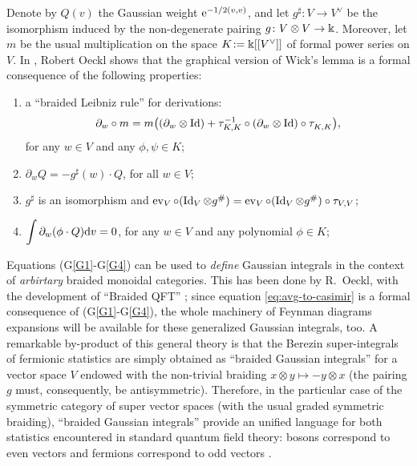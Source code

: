 \begin{remark}
  Denote by $Q(v)$ the Gaussian weight $\mathrm{e}^{-1/2(v,v)}$, and let
  $g^\sharp\colon V\to V^\lor$ be the isomorphism induced by the
  non-degenerate pairing $g\colon V\otimes V\to\Bbbk$. Moreover, let
  $m$ be the usual multiplication on the space $K \joinrel:=
  \fk[[V^\lor]]$ of formal power series on $V$.  In
  \cite{oeckl;braided-qft}, Robert Oeckl shows that the graphical
  version of Wick's lemma is a formal consequence of the following
  properties:
\begin{enumerate}[(G1)]
\item\label{G1} a ``braided Leibniz rule'' for derivations:
\[\partial_w\circ m=m\bigl((\partial_w\otimes
\operatorname{Id})+\tau^{-1}_{K, K}\circ(\partial_w\otimes\operatorname{Id}) \circ \tau^{}_{K,
  K}\bigr),\] for any $w\in V$ and any $\phi, \psi\in K$;
\item\label{G2} $\partial_w Q = -g^\sharp(w)\cdot Q$, for all $w\in V$;
\item\label{G3} $g^\sharp$ is an isomorphism and
$\operatorname{ev}_V\circ(\operatorname{Id}_V\otimes g^\#)=\operatorname{ev}_V\circ(\operatorname{Id}_V\otimes
g^\#)\circ\tau_{V,V}$;
\item\label{G4} 
$\displaystyle{\int\partial_w(\phi\cdot Q)\mathrm{d}v=0}$, for
  any $w\in V$ and any polynomial $\phi\in K$;
\end{enumerate}
Equations (G\ref{G1}-G\ref{G4}) can be used to \emph{define} Gaussian
integrals in the context of \emph{arbirtary} braided monoidal categories.
This has been done by R.~Oeckl, with the development of ``Braided
QFT'' \cite{oeckl;braided-qft}; since equation
\eqref{eq:avg-to-casimir} is a formal consequence of   
(G\ref{G1}-G\ref{G4}), the whole machinery of Feynman diagrams expansions
will be available for these generalized Gaussian integrals, too.
A remarkable by-product of this general
theory is that the Berezin super-integrals of fermionic statistics are
simply obtained as ``braided
Gaussian integrals'' for a vector space $V$ endowed with the non-trivial
braiding $x\otimes y\mapsto -y\otimes x$ (the pairing $g$ must,
consequently, be antisymmetric). Therefore, in the particular case
of the symmetric category of super vector spaces (with the usual graded
symmetric braiding), ``braided Gaussian integrals'' provide an unified
language for both statistics encountered in standard quantum field theory:
bosons correspond to even vectors and fermions correspond to odd vectors
\cite[Sections~3.3 and~3.4]{oeckl;spin-and-statistics}.
\end{remark}
